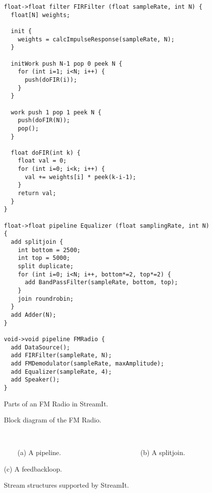 \begin{figure}[t]
\scriptsize
\begin{verbatim}
float->float filter FIRFilter (float sampleRate, int N) {
  float[N] weights;

  init {
    weights = calcImpulseResponse(sampleRate, N);
  }

  initWork push N-1 pop 0 peek N {
    for (int i=1; i<N; i++) {
      push(doFIR(i));
    }
  }

  work push 1 pop 1 peek N {
    push(doFIR(N));
    pop();
  }

  float doFIR(int k) {
    float val = 0;
    for (int i=0; i<k; i++) {
      val += weights[i] * peek(k-i-1);
    }
    return val;
  }
}

float->float pipeline Equalizer (float samplingRate, int N) {
  add splitjoin {
    int bottom = 2500;
    int top = 5000;
    split duplicate;
    for (int i=0; i<N; i++, bottom*=2, top*=2) {
      add BandPassFilter(sampleRate, bottom, top);
    }
    join roundrobin;
  }
  add Adder(N);
}

void->void pipeline FMRadio {
  add DataSource();
  add FIRFilter(sampleRate, N);
  add FMDemodulator(sampleRate, maxAmplitude);
  add Equalizer(sampleRate, 4);
  add Speaker();
}
\end{verbatim}
\caption{Parts of an FM Radio in StreamIt.
\protect\label{fig:radiocode}}
\end{figure}

\begin{figure}[t]
\begin{center}
\hspace{0.1in}
\vspace{-36pt}
\caption{Block diagram of the FM Radio.
\protect\label{fig:radio-ascoded}}
\vspace{10pt}
   ~~~~~~~~ 
\end{center}
~~~~(a) A pipeline. ~~~~~~~~~~~~~~~~~~~~~~ (b) A splitjoin. \\
\vspace{-10pt}
\begin{center}

(c) A feedbackloop. \\
\caption{Stream structures supported by StreamIt.
\protect\label{fig:structures}}
\end{center}
\end{figure}

